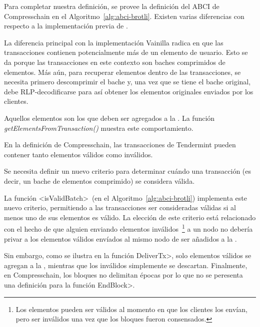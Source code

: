 
%
Para completar nuestra definición, se provee la definición del ABCI de Compresschain en el
Algoritmo~\ref{alg:abci-brotli}.
%
Existen varias diferencias con respecto a la implementación previa de \setchain.
%


La diferencia principal con la implementación Vainilla radica en que las transacciones contienen
potencialmente más de un elemento de usuario. Esto se da porque las transacciones en este contexto
son baches comprimidos de elementos.
%
Más aún, para recuperar elementos dentro de las transacciones, se necesita primero descomprimir
el bache y, una vez que se tiene el bache original, debe RLP-decodificarse para así obtener los elementos
originales enviados por los clientes.

Aquellos elementos son los que deben ser agregados a la \setchain. La función \textit{getElementsFromTransaction()}
muestra este comportamiento.

En la definición de Compresschain, las transacciones de Tendermint pueden contener tanto elementos válidos
como inválidos.
%

Se necesita definir un nuevo criterio para determinar cuándo una transacción (es decir, un bache de elementos
comprimido) se considera válida.

%
La función <isValidBatch>~(en el Algoritmo~\ref{alg:abci-brotli}) implementa este nuevo criterio, permitiendo
a las transacciones ser consideradas válidas si al menos uno de sus elementos es válido.
%
La elección de este criterio está relacionado con el hecho de que alguien enviando elementos inválidos~\footnote{
Los elementos pueden ser válidos al momento en que los clientes los envían, pero ser inválidos una vez que
los bloques fueron consensados.} a un nodo no debería privar a los elementos válidos envíados al mismo nodo de
ser añadidos a la \setchain.

%
Sin embargo, como se ilustra en la función \<DeliverTx>, solo elementos válidos se agregan a la \setchain,
mientras que los inválidos simplemente se descartan.
%
Finalmente, en Compresschain, los bloques no delimitan épocas por lo que no se peresenta una definición para
la función \<EndBlock>.

